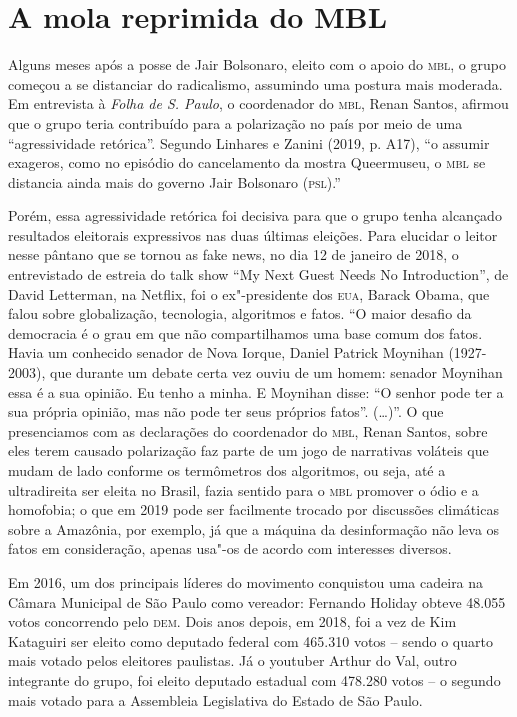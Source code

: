 \section{A mola reprimida do MBL}

Alguns meses após a posse de Jair Bolsonaro, eleito com o apoio do \textsc{mbl},
o grupo começou a se distanciar do radicalismo, assumindo uma postura
mais moderada. Em entrevista à \emph{Folha de S. Paulo}, o coordenador
do \textsc{mbl}, Renan Santos, afirmou que o grupo teria contribuído para a
polarização no país por meio de uma ``agressividade retórica''. Segundo
Linhares e Zanini (2019, p. A17), ``o assumir exageros, como no episódio
do cancelamento da mostra Queermuseu, o \textsc{mbl} se distancia ainda mais do
governo Jair Bolsonaro (\textsc{psl}).''

Porém, essa agressividade retórica foi decisiva para que o grupo tenha
alcançado resultados eleitorais expressivos nas duas últimas eleições.
Para elucidar o leitor nesse pântano que se tornou as fake news, no dia
12 de janeiro de 2018, o entrevistado de estreia do talk show ``My Next
Guest Needs No Introduction'', de David Letterman, na Netflix, foi o
ex"-presidente dos \textsc{eua}, Barack Obama, que falou sobre globalização,
tecnologia, algoritmos e fatos. ``O maior desafio da democracia é o grau
em que não compartilhamos uma base comum dos fatos. Havia um conhecido
senador de Nova Iorque, Daniel Patrick Moynihan (1927-2003), que durante
um debate certa vez ouviu de um homem: senador Moynihan essa é a sua
opinião. Eu tenho a minha. E Moynihan disse: ``O senhor pode ter a sua
própria opinião, mas não pode ter seus próprios fatos''. (\ldots{})''. O que
presenciamos com as declarações do coordenador do \textsc{mbl}, Renan Santos,
sobre eles terem causado polarização faz parte de um jogo de narrativas
voláteis que mudam de lado conforme os termômetros dos algoritmos, ou
seja, até a ultradireita ser eleita no Brasil, fazia sentido para o \textsc{mbl}
promover o ódio e a homofobia; o que em 2019 pode ser facilmente trocado
por discussões climáticas sobre a Amazônia, por exemplo, já que a
máquina da desinformação não leva os fatos em consideração, apenas
usa"-os de acordo com interesses diversos.

Em 2016, um dos principais líderes do movimento conquistou uma cadeira
na Câmara Municipal de São Paulo como vereador: Fernando Holiday obteve
48.055 votos concorrendo pelo \textsc{dem}. Dois anos depois, em 2018, foi a vez
de Kim Kataguiri ser eleito como deputado federal com 465.310 votos --
sendo o quarto mais votado pelos eleitores paulistas. Já o youtuber
Arthur do Val, outro integrante do grupo, foi eleito deputado estadual
com 478.280 votos -- o segundo mais votado para a Assembleia Legislativa
do Estado de São Paulo.

